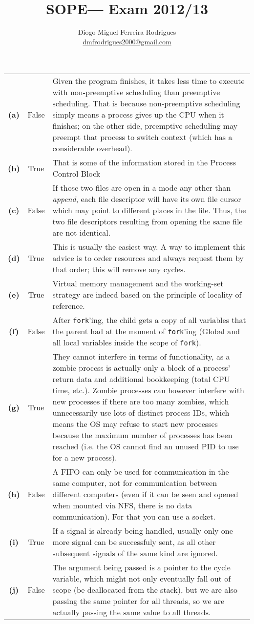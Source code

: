 \documentclass{sope}
\title{SOPE--- Exam 2012/13}
\author{Diogo Miguel Ferreira Rodrigues \\ \href{mailto:dmfrodrigues2000@gmail.com}{dmfrodrigues2000@gmail.com}}
\begin{document}
\setcounter{chapter}{12}
\begin{center} 
    \begin{longtable}{c | c p{132mm}}
        \textbf{(a)} & False & Given the program finishes, it takes less time to execute with non-preemptive scheduling than preemptive scheduling. That is because non-preemptive scheduling simply means a process gives up the CPU when it finishes; on the other side, preemptive scheduling may preempt that process to switch context (which has a considerable overhead). \\
        \textbf{(b)} & True & That is some of the information stored in the Process Control Block \\
        \textbf{(c)} & False & If those two files are open in a mode any other than \emph{append}, each file descriptor will have its own file cursor which may point to different places in the file. Thus, the two file descriptors resulting from opening the same file are not identical. \\
        \textbf{(d)} & True & This is usually the easiest way. A way to implement this advice is to order resources and always request them by that order; this will remove any cycles. \\
        \textbf{(e)} & True & Virtual memory management and the working-set strategy are indeed based on the principle of locality of reference. \\
        \textbf{(f)} & False & After \texttt{fork}'ing, the child gets a copy of all variables that the parent had at the moment of \texttt{fork}'ing (Global and all local variables inside the scope of \texttt{fork}). \\
        \textbf{(g)} & True & They cannot interfere in terms of functionality, as a zombie process is actually only a block of a process' return data and additional bookkeeping (total CPU time, etc.). Zombie processes can however interfere with new processes if there are too many zombies, which unnecessarily use lots of distinct process IDs, which means the OS may refuse to start new processes because the maximum number of processes has been reached (i.e. the OS cannot find an unused PID to use for a new process). \\
        \textbf{(h)} & False & A FIFO can only be used for communication in the same computer, not for communication between different computers (even if it can be seen and opened when mounted via NFS, there is no data communication). For that you can use a socket. \\
        \textbf{(i)} & True & If a signal is already being handled, usually only one more signal can be successfuly sent, as all other subsequent signals of the same kind are ignored. \\
        \textbf{(j)} & False & The argument being passed is a pointer to the cycle variable, which might not only eventually fall out of scope (be deallocated from the stack), but we are also passing the same pointer for all threads, so we are actually passing the same value to all threads.
    \end{longtable}
\end{center}
\end{document}
